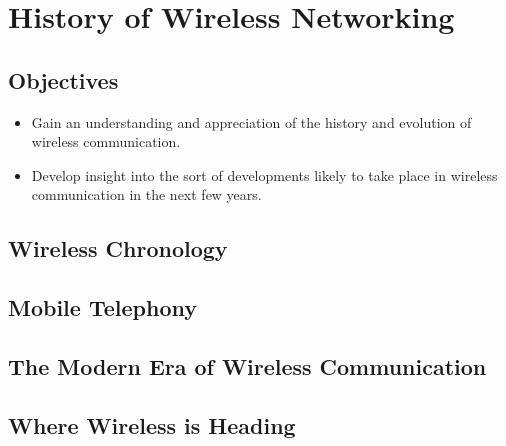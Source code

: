 \chapter{History of Wireless Networking}\label{history}

\minitoc 


\section*{Objectives}
\begin{itemize}

\item Gain an understanding and appreciation of the history and evolution of wireless communication.

\item Develop insight into the sort of developments likely to take place in wireless communication
in the next few years.

\end{itemize}

\section{Wireless Chronology}

\section{Mobile Telephony}

\section{The Modern Era of Wireless Communication}

\section{Where Wireless is Heading}
